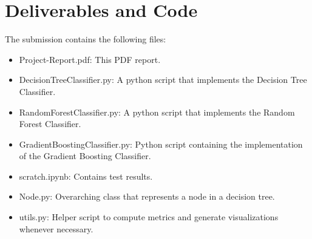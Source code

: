 \graphicspath{{Images/}}

\section{Deliverables and Code}

The submission contains the following files:
\begin{itemize}
    \item Project-Report.pdf: This PDF report.
    \item DecisionTreeClassifier.py: A python script that implements the Decision Tree Classifier.
    \item RandomForestClassifier.py: A python script that implements the Random Forest Classifier.
    \item GradientBoostingClassifier.py: Python script containing the implementation of the Gradient Boosting Classifier.
    \item scratch.ipynb: Contains test results.
    \item Node.py: Overarching class that represents a node in a decision tree.
    \item utils.py: Helper script to compute metrics and generate visualizations whenever necessary.
\end{itemize}



